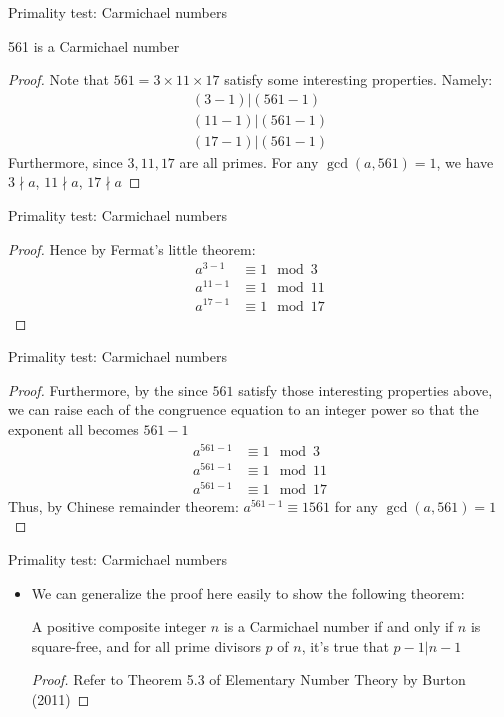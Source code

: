 \documentclass[10pt,xcolor={table,dvipsnames},t]{beamer}
\begin{document}
\begin{frame}{Primality test: Carmichael numbers}
  \begin{theorem}561 is a Carmichael number
    \begin{proof}
      Note that $561=3\times 11\times 17$ satisfy some interesting properties. Namely:
      \begin{align*}
        (3-1) | (561-1) \\
        (11-1) | (561-1) \\
        (17-1) | (561-1)
      \end{align*}
      Furthermore, since $3,11,17$ are all primes. For any $\gcd(a,561)=1$, we have $3\nmid a$, $11\nmid a$, $17\nmid a$
      \phantom\qedhere
    \end{proof}
  \end{theorem}
\end{frame}

\begin{frame}{Primality test: Carmichael numbers}
  \begin{proof}
    Hence by Fermat's little theorem:
    \begin{align*}
      a^{3-1} &\equiv 1 \mod 3\\
      a^{11-1} &\equiv 1 \mod 11\\
      a^{17-1} &\equiv 1 \mod 17
    \end{align*}
    \phantom\qedhere
  \end{proof}
\end{frame}

\begin{frame}{Primality test: Carmichael numbers}
  \begin{proof}
    Furthermore, by the since $561$ satisfy those interesting properties above, we can raise each of the congruence equation to an integer power so that the exponent all becomes $561-1$
    \begin{align*}
      a^{561-1} &\equiv 1 \mod 3\\
      a^{561-1} &\equiv 1 \mod 11\\
      a^{561-1} &\equiv 1 \mod 17
    \end{align*}
    Thus, by Chinese remainder theorem: $a^{561-1} \equiv 1 561$ for any $\gcd(a,561)=1$
  \end{proof}
\end{frame}

\begin{frame}{Primality test: Carmichael numbers}
  \begin{itemize}
    \item We can generalize the proof here easily to show the following theorem:
    \begin{theorem}
      A positive composite integer $n$ is a Carmichael number if and only if $n$ is square-free, and for all prime divisors $p$ of $n$, it's true that $p-1|n-1$
      \begin{proof}
        Refer to Theorem 5.3 of Elementary Number Theory by Burton (2011)
      \end{proof}
    \end{theorem}
  \end{itemize}
\end{frame}
\end{document}
